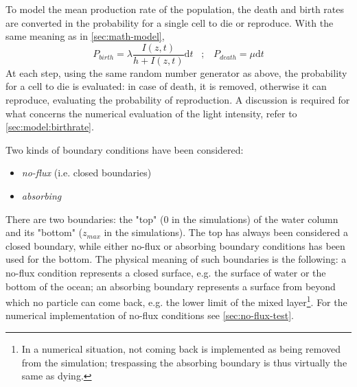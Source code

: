\label{sec:stoc_lang_prod}
To model the mean production rate of the population, the death and birth rates are converted in the probability for a single cell to die or reproduce. With the same meaning as in \autoref{sec:math-model},
\begin{equation} \label{eq:prod_prob}
  P_{birth} = \lambda \frac{I(z,t)}{h+I(z,t)} \mathrm{d}t \;\;\;;\;\;\; P_{death} = \mu\mathrm{d}t 
\end{equation}
At each step, using the same random number generator as above, the probability for a cell to die is evaluated: in case of death, it is removed, otherwise it can reproduce, evaluating the probability of reproduction. A discussion is required for what concerns the numerical evaluation of the light intensity, refer to \autoref{sec:model:birthrate}.


\label{sec:stoc_boundaries}
Two kinds of boundary conditions have been considered:
\begin{itemize}
  \item \textit{no-flux} (i.e. closed boundaries)
  \item \textit{absorbing} 
\end{itemize}
There are two boundaries: the "top" ($0$ in the simulations) of the water column and its "bottom" ($z_{max}$ in the simulations). The top has always been considered a closed boundary, while either no-flux or absorbing boundary conditions has been used for the bottom. The physical meaning of such boundaries is the following: a no-flux condition represents a closed surface, e.g. the surface of water or the bottom of the ocean; an absorbing boundary represents a surface from beyond which no particle can come back, e.g. the lower limit of the mixed layer\footnote{In a numerical situation, not coming back is implemented as being removed from the simulation; trespassing the absorbing boundary is thus virtually the same as dying.}. For the numerical implementation of no-flux conditions see \autoref{sec:no-flux-test}.



